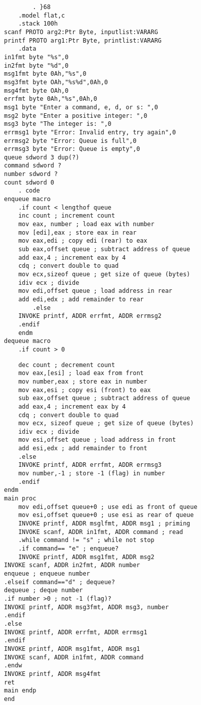 \documentclass[10pt]{article}
\begin{document}
\begin{verbatim}
        . }68
    .model flat,c
    .stack 100h
scanf PROTO arg2:Ptr Byte, inputlist:VARARG
printf PROTO arg1:Ptr Byte, printlist:VARARG
    .data
in1fmt byte "%s",0
in2fmt byte "%d",0
msg1fmt byte 0Ah,"%s",0
msg3fmt byte OAh,"%s%d",0Ah,0
msg4fmt byte OAh,0
errfmt byte 0Ah,"%s",0Ah,0
msg1 byte "Enter a command, e, d, or s: ",0
msg2 byte "Enter a positive integer: ",0
msg3 byte "The integer is: ",0
errmsg1 byte "Error: Invalid entry, try again",0
errmsg2 byte "Error: Queue is full",0
errmsg3 byte "Error: Queue is empty",0
queue sdword 3 dup(?)
command sdword ?
number sdword ?
count sdword 0
    . code
enqueue macro
    .if count < lengthof queue
    inc count ; increment count
    mov eax, number ; load eax with number
    mov [edi],eax ; store eax in rear
    mov eax,edi ; copy edi (rear) to eax
    sub eax,offset queue ; subtract address of queue
    add eax,4 ; increment eax by 4
    cdq ; convert double to quad
    mov ecx,sizeof queue ; get size of queue (bytes)
    idiv ecx ; divide
    mov edi,offset queue ; load address in rear
    add edi,edx ; add remainder to rear
        .else
    INVOKE printf, ADDR errfmt, ADDR errmsg2
    .endif
    endm
dequeue macro
    .if count > 0
\end{verbatim}

\begin{verbatim}
    dec count ; decrement count
    mov eax,[esi] ; load eax from front
    mov number,eax ; store eax in number
    mov eax,esi ; copy esi (front) to eax
    sub eax,offset queue ; subtract address of queue
    add eax,4 ; increment eax by 4
    cdq ; convert double to quad
    mov ecx, sizeof queue ; get size of queue (bytes)
    idiv ecx ; divide
    mov esi,offset queue ; load address in front
    add esi,edx ; add remainder to front
    .else
    INVOKE printf, ADDR errfmt, ADDR errmsg3
    mov number,-1 ; store -1 (flag) in number
    .endif
endm
main proc
    mov edi,offset queue+0 ; use edi as front of queue
    mov esi,offset queue+0 ; use esi as rear of queue
    INVOKE printf, ADDR msglfmt, ADDR msg1 ; priming
    INVOKE scanf, ADDR in1fmt, ADDR command ; read
    .while command != "s" ; while not stop
    .if command== "e" ; enqueue?
    INVOKE printf, ADDR msg1fmt, ADDR msg2
INVOKE scanf, ADDR in2fmt, ADDR number
enqueue ; enqueue number
.elseif command=="d" ; dequeue?
dequeue ; deque number
.if number >0 ; not -1 (flag)?
INVOKE printf, ADDR msg3fmt, ADDR msg3, number
.endif
.else
INVOKE printf, ADDR errfmt, ADDR errmsg1
.endif
INVOKE printf, ADDR msg1fmt, ADDR msg1
INVOKE scanf, ADDR in1fmt, ADDR command
.endw
INVOKE printf, ADDR msg4fmt
ret
main endp
end
\end{verbatim}
\end{document}
